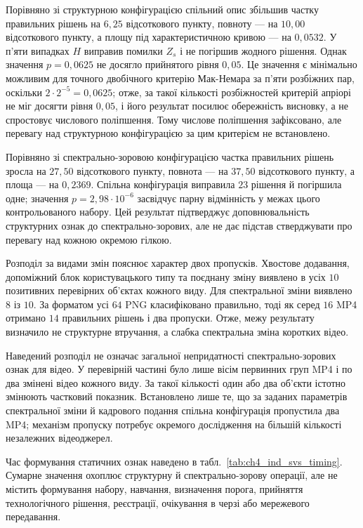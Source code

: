 Порівняно зі структурною конфігурацією спільний опис збільшив частку правильних рішень на $6{,}25$ відсоткового пункту, повноту --- на $10{,}00$ відсоткового пункту, а площу під характеристичною кривою --- на $0{,}0532$. У п’яти випадках $H$ виправив помилки $Z_s$ і не погіршив жодного рішення. Однак значення $p=0{,}0625$ не досягло прийнятого рівня $0{,}05$. Це значення є мінімально можливим для точного двобічного критерію Мак-Немара за п’яти розбіжних пар, оскільки $2\cdot2^{-5}=0{,}0625$; отже, за такої кількості розбіжностей критерій апріорі не міг досягти рівня $0{,}05$, і його результат посилює обережність висновку, а не спростовує числового поліпшення. Тому числове поліпшення зафіксовано, але перевагу над структурною конфігурацією за цим критерієм не встановлено.

Порівняно зі спектрально-зоровою конфігурацією частка правильних рішень зросла на $27{,}50$ відсоткового пункту, повнота --- на $37{,}50$ відсоткового пункту, а площа --- на $0{,}2369$. Спільна конфігурація виправила $23$ рішення й погіршила одне; значення $p=2{,}98\cdot10^{-6}$ засвідчує парну відмінність у межах цього контрольованого набору. Цей результат підтверджує доповнювальність структурних ознак до спектрально-зорових, але не дає підстав стверджувати про перевагу над кожною окремою гілкою.

Розподіл за видами змін пояснює характер двох пропусків. Хвостове додавання, допоміжний блок користувацького типу та поєднану зміну виявлено в усіх $10$ позитивних перевірних об’єктах кожного виду. Для спектральної зміни виявлено $8$ із $10$. За форматом усі $64$ PNG класифіковано правильно, тоді як серед $16$ MP4 отримано $14$ правильних рішень і два пропуски. Отже, межу результату визначило не структурне втручання, а слабка спектральна зміна коротких відео.

Наведений розподіл не означає загальної непридатності спектрально-зорових ознак для відео. У перевірній частині було лише вісім первинних груп MP4 і по два змінені відео кожного виду. За такої кількості один або два об’єкти істотно змінюють частковий показник. Встановлено лише те, що за заданих параметрів спектральної зміни й кадрового подання спільна конфігурація пропустила два MP4; механізм пропуску потребує окремого дослідження на більшій кількості незалежних відеоджерел.

Час формування статичних ознак наведено в табл.~\ref{tab:ch4_ind_svs_timing}. Сумарне значення охоплює структурну й спектрально-зорову операції, але не містить формування набору, навчання, визначення порога, прийняття технологічного рішення, реєстрації, очікування в черзі або мережевого передавання.

